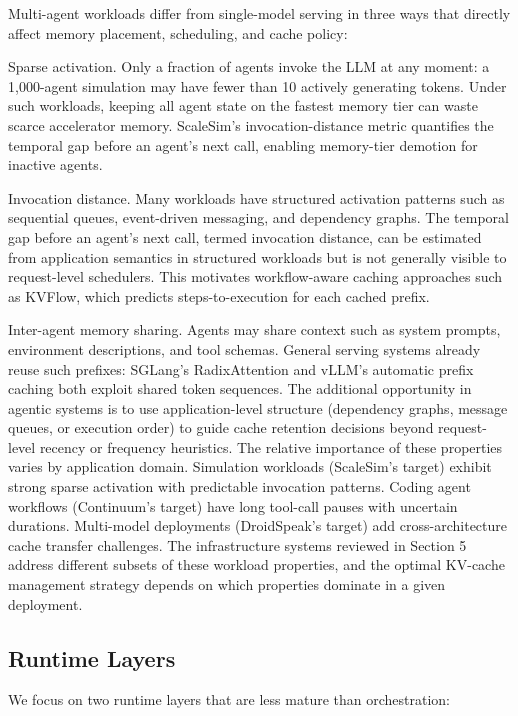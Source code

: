 \documentclass[preprint,12pt]{elsarticle}
\begin{document}
Multi-agent workloads differ from single-model serving in three ways that directly affect memory placement, scheduling, and cache policy:


Sparse activation. Only a fraction of agents invoke the LLM at any moment: a 1,000-agent simulation may have fewer than 10 actively generating tokens. Under such workloads, keeping all agent state on the fastest memory tier can waste scarce accelerator memory. ScaleSim's invocation-distance metric quantifies the temporal gap before an agent's next call, enabling memory-tier demotion for inactive agents.


Invocation distance. Many workloads have structured activation patterns such as sequential queues, event-driven messaging, and dependency graphs. The temporal gap before an agent's next call, termed invocation distance, can be estimated from application semantics in structured workloads but is not generally visible to request-level schedulers. This motivates workflow-aware caching approaches such as KVFlow, which predicts steps-to-execution for each cached prefix.


Inter-agent memory sharing. Agents may share context such as system prompts, environment descriptions, and tool schemas. General serving systems already reuse such prefixes: SGLang's RadixAttention and vLLM's automatic prefix caching both exploit shared token sequences. The additional opportunity in agentic systems is to use application-level structure (dependency graphs, message queues, or execution order) to guide cache retention decisions beyond request-level recency or frequency heuristics. The relative importance of these properties varies by application domain. Simulation workloads (ScaleSim's target) exhibit strong sparse activation with predictable invocation patterns. Coding agent workflows (Continuum's target) have long tool-call pauses with uncertain durations. Multi-model deployments (DroidSpeak's target) add cross-architecture cache transfer challenges. The infrastructure systems reviewed in Section 5 address different subsets of these workload properties, and the optimal KV-cache management strategy depends on which properties dominate in a given deployment.


\subsection{Runtime Layers}


We focus on two runtime layers that are less mature than orchestration:
\end{document}
